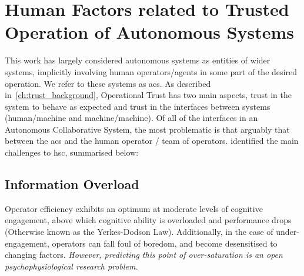 
\chapter{Human Factors related to Trusted Operation of Autonomous Systems}
\label{apx:human_factors}

This work has largely considered autonomous systems as entities of wider systems, implicitly involving human operators/agents in some part of the desired operation.
We refer to these systems as \gls{acs}.
As described in~\autoref{ch:trust_background}, Operational Trust has two main aspects, trust in the system to behave as expected and trust in the interfaces between systems (human/machine and machine/machine).
Of all of the interfaces in an Autonomous Collaborative System, the most problematic is that arguably that between the \gls{acs} and the human operator / team of operators.
\citet{Cummings2010} identified the main challenges to \acrfull{hsc}, summarised below:

\section{Information Overload}
Operator efficiency exhibits an optimum at moderate levels of cognitive engagement, above which cognitive ability is overloaded and performance drops (Otherwise known as the Yerkes-Dodson Law).
Additionally, in the case of under-engagement, operators can fall foul of boredom, and become desensitised to changing factors.
\textit{However, predicting this point of over-saturation is an open psychophysiological research problem.}

